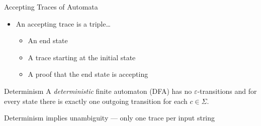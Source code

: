 \documentclass[10pt]{beamer}
\begin{document}
\begin{frame}{Accepting Traces of Automata}
\begin{minipage}{.5\textwidth}
      \begin{itemize}
        \item<6-> An accepting trace is a triple\dots
        \begin{itemize}
          \item<7-> \alert<7>{An end state}
          \item<8-> \alert<8>{A trace starting at the initial state}
          \item<9-> \alert<9>{A proof that the end state is accepting}
        \end{itemize}
      \end{itemize}
    \end{minipage}%
\end{frame}

\begin{frame}{Determinism}
  A \emph{deterministic} finite automaton (DFA) has no $\varepsilon$-transitions and for every state there is exactly one outgoing transition for each $c \in \Sigma$.

   \begin{center}
    \end{center}

    Determinism implies unambiguity --- only one trace per input string
\end{frame}
\end{document}
